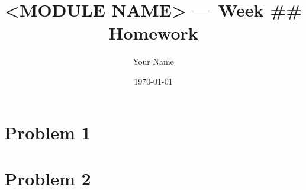 \documentclass[11pt]{article}
\title{<MODULE NAME> — Week \#\# Homework}
\author{Your Name}
\date{\today}
\begin{document}
\maketitle

\section{Problem 1}

\section{Problem 2}
\end{document}
